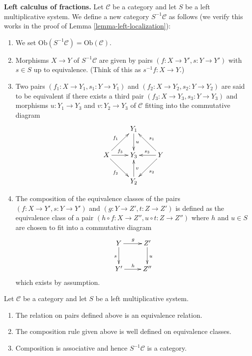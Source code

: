 \medskip\noindent
{\bf Left calculus of fractions.}
Let $\mathcal{C}$ be a category and let $S$ be a left multiplicative
system. We define a new category $S^{-1}\mathcal{C}$ as follows
(we verify this works in the proof of
Lemma \ref{lemma-left-localization}):
\begin{enumerate}
\item We set $\text{Ob}(S^{-1}\mathcal{C}) = \text{Ob}(\mathcal{C})$.
\item Morphisms $X \to Y$ of $S^{-1}\mathcal{C}$ are given by pairs
$(f : X \to Y', s : Y \to Y')$ with $s \in S$ up to equivalence.
(Think of this as $s^{-1}f : X \to Y$.)
\item Two pairs $(f_1 : X \to Y_1, s_1 : Y \to Y_1)$ and
$(f_2 : X \to Y_2, s_2 : Y \to Y_2)$ are said to be equivalent
if there exists a third pair $(f_3 : X \to Y_3, s_3 : Y \to Y_3)$
and morphisms $u : Y_1 \to Y_3$ and $v : Y_2 \to Y_3$ of $\mathcal{C}$
fitting into the commutative diagram
$$
\xymatrix{
 & Y_1 \ar[d]^u & \\
X \ar[ru]^{f_1} \ar[r]^{f_3} \ar[rd]_{f_2} &
Y_3 &
Y \ar[lu]_{s_1} \ar[l]_{s_3} \ar[ld]^{s_2} \\
& Y_2 \ar[u]_v &
}
$$
\item The composition of the equivalence classes of the pairs
$(f : X \to Y', s : Y \to Y')$ and $(g : Y \to Z', t : Z \to Z')$
is defined as the equivalence class of a pair
$(h \circ f : X \to Z'', u \circ t : Z \to Z'')$
where $h$ and $u \in S$ are chosen to fit into a commutative diagram
$$
\xymatrix{
Y \ar[d]_s \ar[r]^g & Z' \ar[d]^u \\
Y' \ar[r]^h & Z''
}
$$
which exists by assumption.
\end{enumerate}

\begin{lemma}
\label{lemma-left-localization}
Let $\mathcal{C}$ be a category and let $S$ be a left multiplicative
system.
\begin{enumerate}
\item The relation on pairs defined above is an equivalence relation.
\item The composition rule given above is well defined on equivalence
classes.
\item Composition is associative and hence $S^{-1}\mathcal{C}$
is a category.
\end{enumerate}
\end{lemma}

